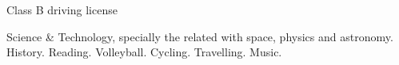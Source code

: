 \documentclass[helvetica,openbib,logo,notitle,flagCMYK,totpages, english]{europecv}
\begin{document}
\begin{europecv}
{
Class B driving license
}


{
Science \& Technology, specially the related with space, physics and astronomy. History. Reading. Volleyball. Cycling. Travelling. Music.
}


\end{europecv}
\end{document}
